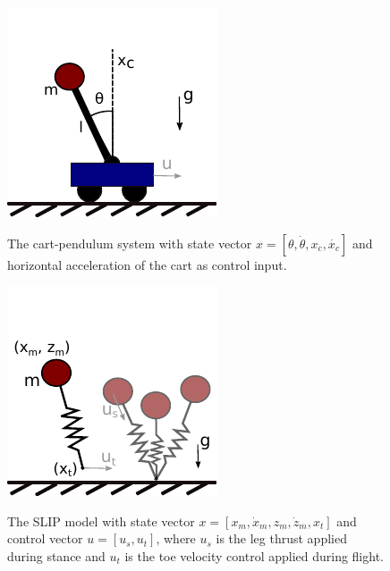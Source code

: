 \begin{figure}[h]
\centering \captionsetup{width=0.45\linewidth}
\begin{multicols}{2}
\includegraphics[width=0.9\columnwidth]{cart-pend.pdf}
\caption{The cart-pendulum system with state vector $x=[\theta, \dot{\theta}, x_c, \dot{x_c}]$ and horizontal acceleration of the cart as control input.}
\label{fig: cartpend-schematic}
\includegraphics[width=0.9\columnwidth, keepaspectratio]{SLIP.pdf}
\caption{The SLIP model with state vector $x = [x_m, \dot{x}_m, z_m, \dot{z}_m, x_t]$ and control vector $u = [u_s,u_t]$, where $u_s$ is the leg thrust applied during stance and $u_t$ is the toe velocity control applied during flight.}
\label{fig: slip-schematic}
\end{multicols}
\end{figure}


